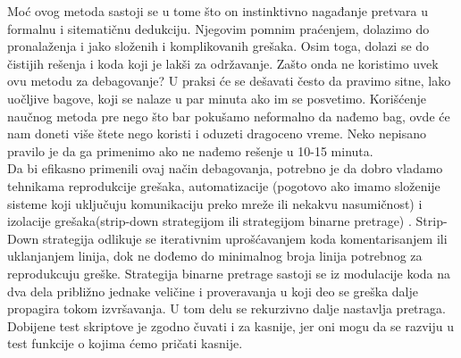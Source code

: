 \documentclass[a4paper]{article}
\begin{document}
	Moć ovog metoda sastoji se u tome što on instinktivno nagađanje pretvara u formalnu i sitematičnu dedukciju. Njegovim pomnim praćenjem, dolazimo do pronalaženja i jako složenih i komplikovanih grešaka. Osim toga, dolazi se do čistijih rešenja i koda koji je lakši za održavanje.
	Zašto onda ne koristimo uvek ovu metodu za debagovanje?  U praksi će se dešavati često da pravimo sitne, lako uočljive bagove, koji se nalaze u par minuta ako im se posvetimo. Korišćenje naučnog metoda pre nego što bar pokušamo neformalno da nađemo bag, ovde će nam doneti više štete nego koristi i oduzeti dragoceno vreme. Neko nepisano pravilo je da ga primenimo ako ne nađemo rešenje u 10-15 minuta. \\
	Da bi efikasno primenili ovaj način debagovanja, potrebno je da dobro vladamo tehnikama reprodukcije grešaka, automatizacije (pogotovo ako imamo složenije sisteme koji uključuju komunikaciju preko mreže ili nekakvu nasumičnost) i izolacije grešaka(strip-down strategijom ili strategijom binarne pretrage) \cite{proPyDeb}.
	Strip-Down strategija odlikuje se iterativnim uprošćavanjem koda komentarisanjem ili uklanjanjem linija, dok ne dođemo do minimalnog broja linija potrebnog za  reprodukcuju greške. Strategija binarne pretrage sastoji se iz modulacije koda na dva dela približno jednake veličine i proveravanja u koji deo se greška dalje propagira tokom izvršavanja. U tom delu se rekurzivno dalje nastavlja pretraga. Dobijene test skriptove je zgodno čuvati i za kasnije, jer oni mogu da se razviju u test funkcije o kojima ćemo pričati kasnije.
\end{document}
